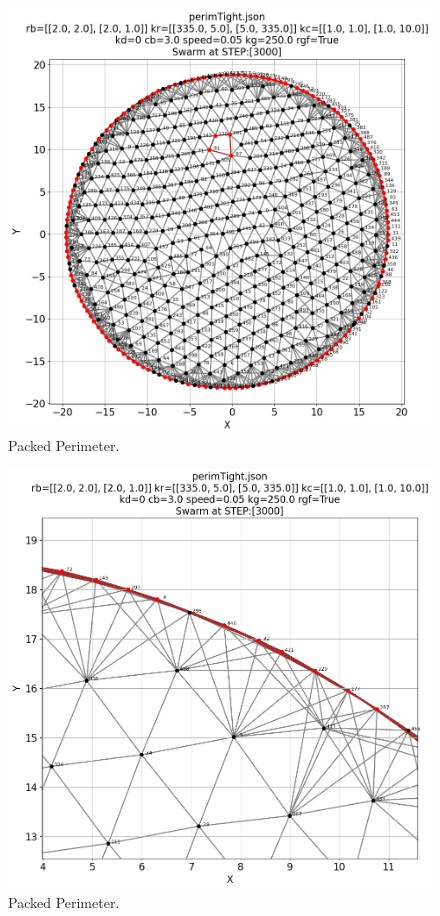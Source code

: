 \documentclass[12pt,a4paper]{IEEEtran}
\begin{document}
\begin{figure}[H]
	\begin{center}
		\includegraphics[width=1.0\linewidth]{figures/tightPerim}
	\end{center}
	\caption{Packed Perimeter. \label{fig:tightPerim}}
\end{figure}

\begin{figure}[H]
	\begin{center}
		\includegraphics[width=1.0\linewidth]{figures/tightPerim2}
	\end{center}
	\caption{Packed Perimeter. \label{fig:tightPerim2}}
\end{figure}
\end{document}
